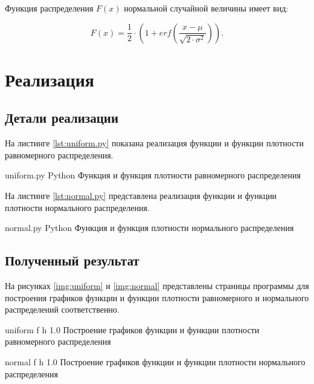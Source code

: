 Функция распределения $F(x)$ нормальной случайной величины имеет вид:

\begin{equation}
    F(x) = \frac{1}{2} \cdot (1 + erf(\frac{x - \mu}{\sqrt{2 \cdot \sigma^2}})).
\end{equation}

\chapter{Реализация}

\section{Детали реализации}

На листинге \ref{lst:uniform.py} показана реализация функции и функции плотности равномерного распределения.

    {uniform.py}
    {Python}
    {Функция и функция плотности равномерного распределения}
    
На листинге \ref{lst:normal.py} представлена реализация функции и функции плотности нормального распределения.

    {normal.py}
    {Python}
    {Функция и функция плотности нормального распределения}

\section{Полученный результат}

На рисунках \ref{img:uniform} и \ref{img:normal} представлены страницы программы для построения графиков функции и функции плотности равномерного и нормального распределений соответственно.

    {uniform}
    {f}
    {h}
    {1.0\textwidth}
    {Построение графиков функции и функции плотности равномерного распределения}

    {normal}
    {f}
    {h}
    {1.0\textwidth}
    {Построение графиков функции и функции плотности нормального распределения}

